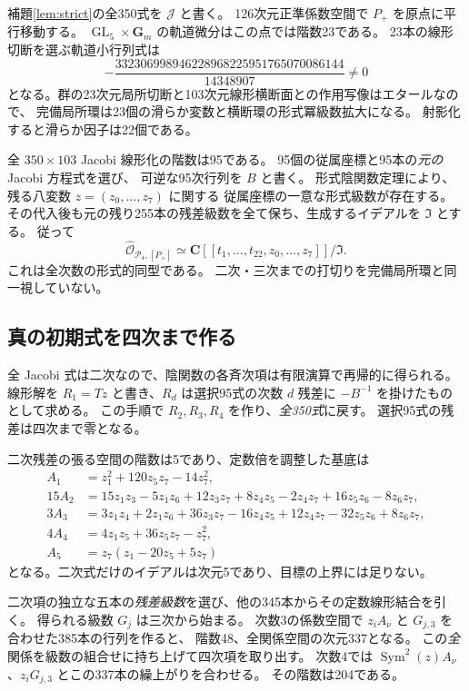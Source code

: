 \documentclass[11pt,a4paper]{ltjsarticle}
\newcommand{\CC}{\mathbf C}
\newcommand{\GG}{\mathbf G}
\newcommand{\cP}{\mathcal P_4}
\newcommand{\Sym}{\operatorname{Sym}}
\DeclareMathOperator{\GL}{GL}
\theoremstyle{remark}
\begin{document}
補題\ref{lem:strict}の全350式を $\mathcal J$ と書く。
126次元正準係数空間で $P_+$ を原点に平行移動する。
$\GL_5\times\GG_m$ の軌道微分はこの点では階数23である。
23本の線形切断を選ぶ軌道小行列式は
\[
 -\frac{332306998946228968225951765070086144}{14348907}\ne0
\]
となる。群の23次元局所切断と103次元線形横断面との作用写像はエタールなので、
完備局所環は23個の滑らか変数と横断環の形式冪級数拡大になる。
射影化すると滑らか因子は22個である。

全 $350\times103$ Jacobi 線形化の階数は95である。
95個の従属座標と95本の\emph{元の} Jacobi 方程式を選び、
可逆な95次行列を $B$ と書く。
形式陰関数定理により、残る八変数 $z=(z_0,\ldots,z_7)$ に関する
従属座標の一意な形式級数が存在する。
その代入後も元の残り255本の残差級数を全て保ち、生成するイデアルを $\mathfrak I$ とする。
従って
\begin{equation}\label{eq:full-formal}
 \widehat{\mathcal O}_{\cP,[P_+]}
 \simeq\CC[[t_1,\ldots,t_{22},z_0,\ldots,z_7]]/\mathfrak I.
\end{equation}
これは全次数の形式的同型である。
二次・三次までの打切りを完備局所環と同一視していない。

\subsection{真の初期式を四次まで作る}

全 Jacobi 式は二次なので、陰関数の各斉次項は有限演算で再帰的に得られる。
線形解を $R_1=Tz$ と書き、$R_d$ は選択95式の次数 $d$ 残差に
$-B^{-1}$ を掛けたものとして求める。
この手順で $R_2,R_3,R_4$ を作り、\emph{全350式}に戻す。
選択95式の残差は四次まで零となる。

二次残差の張る空間の階数は5であり、定数倍を調整した基底は
\begin{equation}\label{eq:quadrics}
\begin{aligned}
 A_1&=z_1^2+120z_5z_7-14z_7^2,\\
 15A_2&=15z_1z_3-5z_1z_6+12z_3z_7+8z_4z_5-2z_4z_7
                         +16z_5z_6-8z_6z_7,\\
 3A_3&=3z_1z_4+2z_1z_6+36z_3z_7-16z_4z_5+12z_4z_7
                         -32z_5z_6+8z_6z_7,\\
 4A_4&=4z_1z_5+36z_5z_7-z_7^2,\\
 A_5&=z_7(z_1-20z_5+5z_7)
\end{aligned}
\end{equation}
となる。二次式だけのイデアルは次元5であり、目標の上界には足りない。

二次項の独立な五本の\emph{残差級数}を選び、他の345本からその定数線形結合を引く。
得られる級数 $G_j$ は三次から始まる。
次数3の係数空間で $z_i A_\nu$ と $G_{j,3}$ を合わせた385本の行列を作ると、
階数48、全関係空間の次元337となる。
この\emph{全}関係を級数の組合せに持ち上げて四次項を取り出す。
次数4では $\Sym^2(z)A_\nu$、$z_iG_{j,3}$ とこの337本の繰上がりを合わせる。
その階数は204である。
\end{document}
